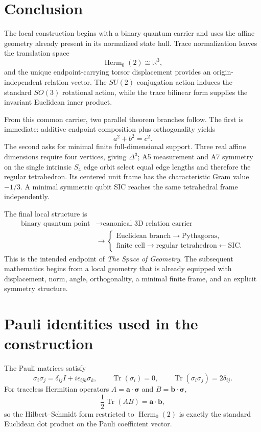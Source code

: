 \documentclass[12pt,a4paper]{article}
\newcommand{\Herm}{\operatorname{Herm}}
\newcommand{\Tr}{\operatorname{Tr}}
\newcommand{\R}{\mathbb{R}}
\newcommand{\sigmavec}{\bm{\sigma}}
\begin{document}
\section{Conclusion}

The local construction begins with a binary quantum carrier and uses the affine geometry already present in its normalized state hull. Trace normalization leaves the translation space
\[
\Herm_0(2)\cong\R^3,
\]
and the unique endpoint-carrying torsor displacement provides an origin-independent relation vector. The $SU(2)$ conjugation action induces the standard $SO(3)$ rotational action, while the trace bilinear form supplies the invariant Euclidean inner product.

From this common carrier, two parallel theorem branches follow. The first is immediate: additive endpoint composition plus orthogonality yields
\[
\boxed{a^2+b^2=c^2.}
\]
The second asks for minimal finite full-dimensional support. Three real affine dimensions require four vertices, giving $\Delta^3$; A5 measurement and A7 symmetry on the single intrinsic $S_4$ edge orbit select equal edge lengths and therefore the regular tetrahedron. Its centered unit frame has the characteristic Gram value $-1/3$. A minimal symmetric qubit SIC reaches the same tetrahedral frame independently.

The final local structure is
\[
\boxed{
\begin{aligned}
\text{binary quantum point}
&\longrightarrow \text{canonical 3D relation carrier}\\
&\longrightarrow
\begin{cases}
\text{Euclidean branch}\longrightarrow\text{Pythagoras},\\
\text{finite cell}\longrightarrow\text{regular tetrahedron}\longleftarrow\text{SIC}.
\end{cases}
\end{aligned}}
\]
This is the intended endpoint of \emph{The Space of Geometry}. The subsequent mathematics begins from a local geometry that is already equipped with displacement, norm, angle, orthogonality, a minimal finite frame, and an explicit symmetry structure.

\appendix
\section{Pauli identities used in the construction}

The Pauli matrices satisfy
\[
\sigma_i\sigma_j=\delta_{ij}I+i\epsilon_{ijk}\sigma_k,
\qquad
\Tr(\sigma_i)=0,
\qquad
\Tr(\sigma_i\sigma_j)=2\delta_{ij}.
\]
For traceless Hermitian operators $A=\bm{a}\cdot\sigmavec$ and $B=\bm{b}\cdot\sigmavec$,
\[
\frac12\Tr(AB)=\bm{a}\cdot\bm{b},
\]
so the Hilbert--Schmidt form restricted to $\Herm_0(2)$ is exactly the standard Euclidean dot product on the Pauli coefficient vector.
\end{document}
